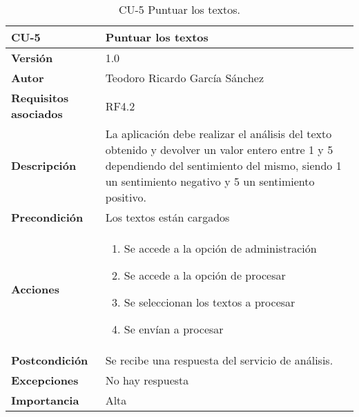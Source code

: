 \begin{table}[p]
	\centering
	\begin{tabularx}{\linewidth}{ p{} p{} }
		\toprule
		\textbf{CU-5}    & \textbf{Puntuar los textos}\\
		\toprule
		\textbf{Versión}              & 1.0    \\
		\textbf{Autor}                & Teodoro Ricardo García Sánchez \\
		\textbf{Requisitos asociados} & RF4.2 \\
		\textbf{Descripción}          & La aplicación debe realizar el análisis del texto obtenido
										 y devolver un valor entero entre 1 y 5 dependiendo del sentimiento del mismo, siendo 1 un sentimiento negativo y 5 un sentimiento positivo. \\
		\textbf{Precondición}         & Los textos están cargados \\
		\textbf{Acciones}             &
		\begin{enumerate}
			\def\labelenumi{\arabic{enumi}.}
			\tightlist
			\item Se accede a la opción de administración
			\item Se accede a la opción de procesar
			\item Se seleccionan los textos a procesar
			\item Se envían a procesar
		\end{enumerate}\\
		\textbf{Postcondición}        & Se recibe una respuesta del servicio de análisis.\\
		\textbf{Excepciones}          & No hay respuesta \\
		\textbf{Importancia}          & Alta \\
		\bottomrule
	\end{tabularx}
	\caption{CU-5 Puntuar los textos.}
\end{table}

